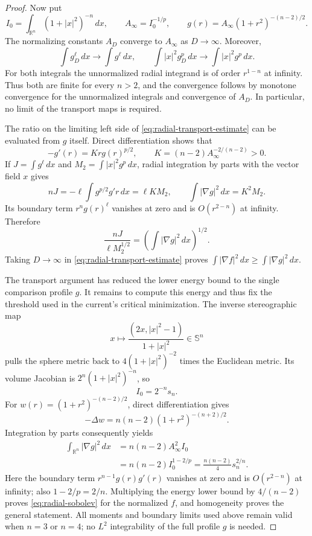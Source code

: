 \documentclass[11pt]{article}
\numberwithin{equation}{section}
\theoremstyle{definition}
\theoremstyle{remark}
\begin{document}
\begin{proof}
Now put
\[
 I_0=\int_{\mathbb R^n}(1+|x|^2)^{-n}\,d x,
 \qquad A_\infty=I_0^{-1/p},\qquad
 g(r)=A_\infty(1+r^2)^{-(n-2)/2}.
\]
The normalizing constants $A_D$ converge to $A_\infty$ as
$D\to\infty$.  Moreover,
\[
 \int g_D^\ell\,d x\longrightarrow\int g^\ell\,d x,
 \qquad
 \int|x|^2g_D^p\,d x\longrightarrow\int|x|^2g^p\,d x.
\]
For both integrals the unnormalized radial integrand is of order
$r^{1-n}$ at infinity.  Thus both are finite for every $n>2$, and
the convergence follows by monotone convergence for the
unnormalized integrals and convergence of $A_D$.
In particular, no limit of the transport maps is required.

The ratio on the limiting left side of
\eqref{eq:radial-transport-estimate} can be evaluated from $g$ itself.
Direct differentiation shows that
\[
 -g'(r)=Krg(r)^{p/2},\qquad
 K=(n-2)A_\infty^{-2/(n-2)}>0.
\]
If $J=\int g^\ell\,d x$ and $M_2=\int|x|^2g^p\,d x$, radial
integration by parts with the vector field $x$ gives
\[
 nJ=-\ell\int g^{p/2}g'r\,d x=\ell K M_2,
 \qquad \int|\nabla g|^2\,d x=K^2M_2.
\]
Its boundary term $r^ng(r)^\ell$ vanishes at zero and is
$O(r^{2-n})$ at infinity.  Therefore
\begin{equation}
 \frac{nJ}{\ell M_2^{1/2}}
    =\left(\int|\nabla g|^2\,d x\right)^{1/2}.
 \label{eq:bubble-transport-ratio}
\end{equation}
Taking $D\to\infty$ in \eqref{eq:radial-transport-estimate} proves
$\int|\nabla f|^2\,d x\ge\int|\nabla g|^2\,d x$.

The transport argument has reduced the lower energy bound to the
single comparison profile $g$. It remains to compute this energy and
thus fix the threshold used in the current's critical minimization.
The inverse stereographic map
\[
 x\longmapsto\frac{(2x,|x|^2-1)}{1+|x|^2}\in\mathbb S^n
\]
pulls the sphere metric back to $4(1+|x|^2)^{-2}$ times the Euclidean
metric.  Its volume Jacobian is $2^n(1+|x|^2)^{-n}$, so
\begin{equation}
 I_0=2^{-n}s_n.
 \label{eq:stereographic-integral}
\end{equation}
For $w(r)=(1+r^2)^{-(n-2)/2}$, direct differentiation gives
\[
 -\Delta w=n(n-2)(1+r^2)^{-(n+2)/2}.
\]
Integration by parts consequently yields
\begin{align*}
 \int_{\mathbb R^n}|\nabla g|^2\,d x
 &=n(n-2)A_\infty^2I_0\\
 &=n(n-2)I_0^{1-2/p}
   =\frac{n(n-2)}4s_n^{2/n}.
\end{align*}
Here the boundary term $r^{n-1}g(r)g'(r)$ vanishes at zero and is
$O(r^{2-n})$ at infinity; also $1-2/p=2/n$.
Multiplying the energy lower bound by $4/(n-2)$ proves
\eqref{eq:radial-sobolev} for the normalized $f$, and homogeneity
proves the general statement.  All moments and boundary limits
used above remain valid when $n=3$ or $n=4$; no $L^2$ integrability
of the full profile $g$ is needed.


\end{proof}
\end{document}
